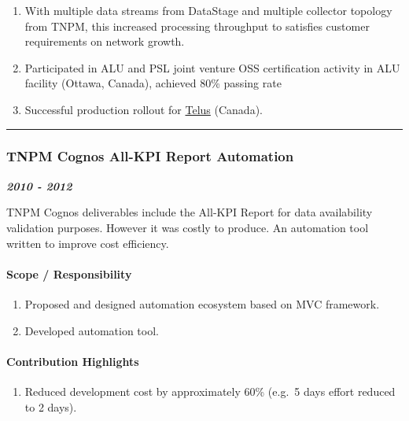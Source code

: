 \documentclass[
]{article}
\providecommand{\tightlist}{%
  \setlength{\itemsep}{0pt}\setlength{\parskip}{0pt}}
\begin{document}
\begin{enumerate}
\def\labelenumi{\arabic{enumi}.}
\tightlist
\item
  With multiple data streams from DataStage and multiple collector
  topology from TNPM, this increased processing throughput to satisfies
  customer requirements on network growth.
\item
  Participated in ALU and PSL joint venture OSS certification activity
  in ALU facility (Ottawa, Canada), achieved 80\% passing rate
\item
  Successful production rollout for \href{http://www.telus.com}{Telus}
  (Canada).
\end{enumerate}

\begin{center}\rule{0.5\linewidth}{0.5pt}\end{center}

\hypertarget{tnpm-cognos-all-kpi-report-automation}{%
\subsubsection{TNPM Cognos All-KPI Report
Automation}\label{tnpm-cognos-all-kpi-report-automation}}

\textbf{\emph{2010 - 2012}}

TNPM Cognos deliverables include the All-KPI Report for data
availability validation purposes. However it was costly to produce. An
automation tool written to improve cost efficiency.

\hypertarget{scope-responsibility-11}{%
\paragraph{Scope / Responsibility}\label{scope-responsibility-11}}

\begin{enumerate}
\def\labelenumi{\arabic{enumi}.}
\tightlist
\item
  Proposed and designed automation ecosystem based on MVC framework.
\item
  Developed automation tool.
\end{enumerate}

\hypertarget{contribution-highlights-10}{%
\paragraph{Contribution Highlights}\label{contribution-highlights-10}}

\begin{enumerate}
\def\labelenumi{\arabic{enumi}.}
\tightlist
\item
  Reduced development cost by approximately 60\% (e.g.~5 days effort
  reduced to 2 days).
\end{enumerate}
\end{document}
